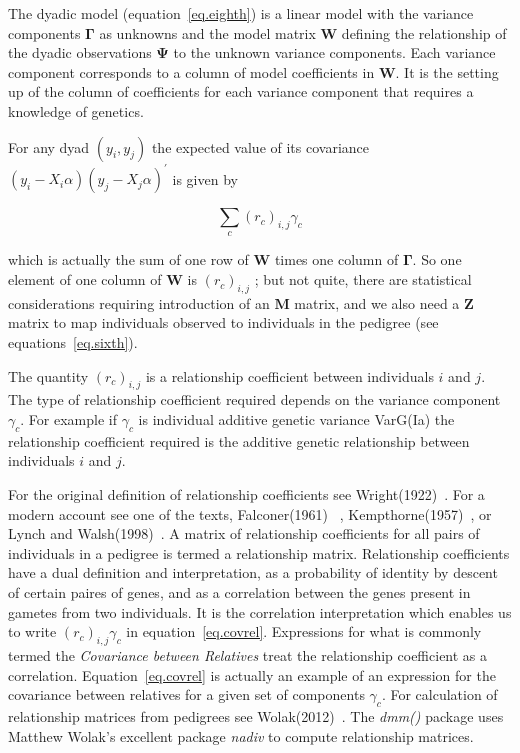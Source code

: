 \documentclass[titlepage]{article}  %
\begin{document}
 The dyadic model (equation~\ref{eq.eighth}) is a linear model with the variance components ${\bm \Gamma}$ as unknowns and the model matrix ${\bm W}$ defining the relationship of the dyadic observations ${\bm \Psi}$ to the unknown variance components. Each variance component corresponds to a column of model coefficients in ${\bm W}$. It is the setting up of the column of coefficients for each variance component that requires a knowledge of genetics.

 For any dyad $(y_{i},y_{j})$ the expected value of its covariance $(y_{i} - X_{i}\alpha)(y_{j} - X_{j}\alpha)^{\prime}$ is given by

\begin{equation}
\sum_{c}{(r_{c})_{i,j}\gamma_{c}}  \label{eq.covrel}
\end{equation}

which is actually the sum of one row of ${\bm W}$ times one column of ${\bm \Gamma}$. So one element of one column of ${\bm W}$ is $(r_{c})_{i,j}$ ; but not quite, there are statistical considerations requiring introduction of an ${\bm M}$ matrix, and we also need a ${\bm Z}$ matrix to map individuals observed to individuals in the pedigree (see equations~\ref{eq.sixth}).

The quantity $(r_{c})_{i,j}$ is a relationship coefficient between individuals $i$ and $j$. The type of relationship coefficient required depends on the variance component $\gamma_{c}$. For example if $\gamma_{c}$ is individual additive genetic variance VarG(Ia) the relationship coefficient required is the additive genetic relationship between individuals $i$ and $j$.

For the original definition of relationship coefficients see Wright(1922)~\cite{wrig:22}. For a modern account see one of the texts, Falconer(1961)~\cite{falc:61} , Kempthorne(1957)~\cite{kemp:57}, or Lynch and Walsh(1998)~\cite{lync:98}.  A matrix of relationship coefficients for all pairs of individuals in a pedigree is termed a relationship matrix. Relationship coefficients have a dual definition and interpretation, as a probability of identity by descent of certain paires of genes, and as a correlation between the genes present in gametes from two individuals. It is the correlation interpretation which enables us to write $(r_{c})_{i,j}\gamma_{c}$ in equation~\ref{eq.covrel}. Expressions for what is commonly termed the {\em Covariance between Relatives} treat the relationship coefficient as a correlation. Equation~\ref{eq.covrel} is actually an example of an expression for the covariance between relatives for a given set of components $\gamma_{c}$.  For calculation of relationship matrices from pedigrees see Wolak(2012)~\cite{wola:12}. The {\em dmm()} package uses Matthew Wolak's excellent package {\em nadiv} to compute relationship matrices. 
\end{document}
